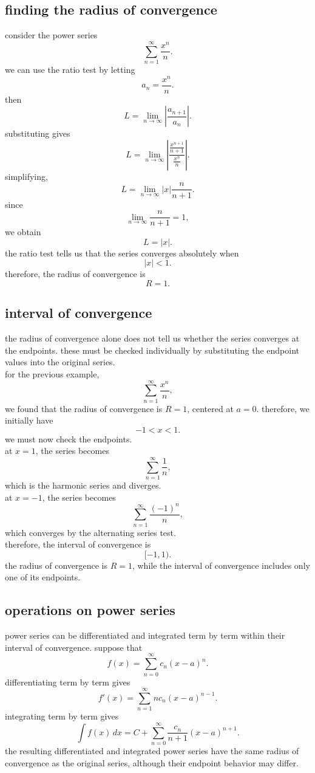 \documentclass{article}
\begin{document}
\subsection{finding the radius of convergence}

consider the power series
\[
\sum_{n=1}^{\infty}\frac{x^n}{n}.
\]
we can use the ratio test by letting
\[
a_n=\frac{x^n}{n}.
\]
then
\[
L=
\lim_{n\to\infty}
\left|\frac{a_{n+1}}{a_n}\right|.
\]
substituting gives
\[
L=
\lim_{n\to\infty}
\left|
\frac{\frac{x^{n+1}}{n+1}}{\frac{x^n}{n}}
\right|.
\]
simplifying,
\[
L=
\lim_{n\to\infty}
|x|\frac{n}{n+1}.
\]
since
\[
\lim_{n\to\infty}\frac{n}{n+1}=1,
\]
we obtain
\[
L=|x|.
\]
the ratio test tells us that the series converges absolutely when
\[
|x|<1.
\]
therefore, the radius of convergence is
\[
\boxed{R=1.}
\]

\subsection{interval of convergence}

the radius of convergence alone does not tell us whether the series converges at the endpoints. these must be checked individually by substituting the endpoint values into the original series.\\

for the previous example,
\[
\sum_{n=1}^{\infty}\frac{x^n}{n},
\]
we found that the radius of convergence is $R=1$, centered at $a=0$. therefore, we initially have
\[
-1<x<1.
\]
we must now check the endpoints.\\

at $x=1$, the series becomes
\[
\sum_{n=1}^{\infty}\frac{1}{n},
\]
which is the harmonic series and diverges.\\

at $x=-1$, the series becomes
\[
\sum_{n=1}^{\infty}\frac{(-1)^n}{n},
\]
which converges by the alternating series test.\\

therefore, the interval of convergence is
\[
\boxed{[-1,1).}
\]
the radius of convergence is $R=1$, while the interval of convergence includes only one of its endpoints.\\

\subsection{operations on power series}

power series can be differentiated and integrated term by term within their interval of convergence. suppose that
\[
f(x)=\sum_{n=0}^{\infty}c_n(x-a)^n.
\]
differentiating term by term gives
\[
f'(x)=
\sum_{n=1}^{\infty}nc_n(x-a)^{n-1}.
\]
integrating term by term gives
\[
\int f(x)\,dx
=
C+\sum_{n=0}^{\infty}
\frac{c_n}{n+1}(x-a)^{n+1}.
\]
the resulting differentiated and integrated power series have the same radius of convergence as the original series, although their endpoint behavior may differ.\\
\end{document}
